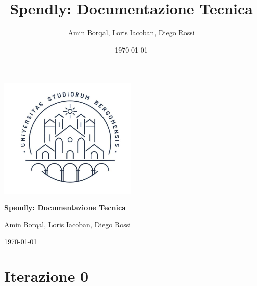 \documentclass[12pt]{article}   %
\title{Spendly: Documentazione Tecnica}
\author{Amin Borqal, Loris Iacoban, Diego Rossi}
\date{\today}
\begin{document}
\begin{titlepage}
  \centering
  \vspace*{2cm} %

  \includegraphics[width=0.5\textwidth]{images/Marchio.jpg}\par
  \vspace{1cm}
  
  {\Huge \bfseries Spendly: Documentazione Tecnica\par}
  \vspace{1cm}
  
  {\Large Amin Borqal, Loris Iacoban, Diego Rossi\par}
  \vspace{1cm}
  
  {\Large \today\par}
  \vfill
\end{titlepage}

\tableofcontents
{} %
\newpage
\listoffigures
\listoftables
\newpage 

\section{Iterazione 0}



\newpage

\newpage




\newpage

\end{document}
